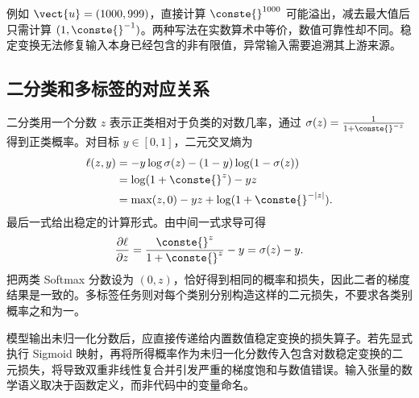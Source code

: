 \documentclass[../textbook.tex]{subfiles}
\begin{document}
例如 $\vect{u}=(1000,999)$，直接计算 $\conste{}^{1000}$ 可能溢出，减去最大值后只需计算 $(1,\conste{}^{-1})$。两种写法在实数算术中等价，数值可靠性却不同。稳定变换无法修复输入本身已经包含的非有限值，异常输入需要追溯其上游来源。

\subsection{二分类和多标签的对应关系}
二分类用一个分数 $z$ 表示正类相对于负类的对数几率，通过
$\sigma(z)=\frac{1}{1+\conste{}^{-z}}$ 得到正类概率。对目标 $y\in[0,1]$，二元交叉熵为
\begin{align}
 \ell(z,y)&=-y\log\sigma(z)-(1-y)\log(1-\sigma(z))\\
 &=\log(1+\conste{}^z)-yz\\
 &=\max(z,0)-yz+\log(1+\conste{}^{-|z|}).
\end{align}
最后一式给出稳定的计算形式。由中间一式求导可得
\begin{equation}
 \frac{\partial\ell}{\partial z}=\frac{\conste{}^z}{1+\conste{}^z}-y=\sigma(z)-y.
\end{equation}
把两类 Softmax 分数设为 $(0,z)$，恰好得到相同的概率和损失，因此二者的梯度结果是一致的。多标签任务则对每个类别分别构造这样的二元损失，不要求各类别概率之和为一。

模型输出未归一化分数后，应直接传递给内置数值稳定变换的损失算子。若先显式执行 Sigmoid 映射，再将所得概率作为未归一化分数传入包含对数稳定变换的二元损失，将导致双重非线性复合并引发严重的梯度饱和与数值错误。输入张量的数学语义取决于函数定义，而非代码中的变量命名。
\end{document}
